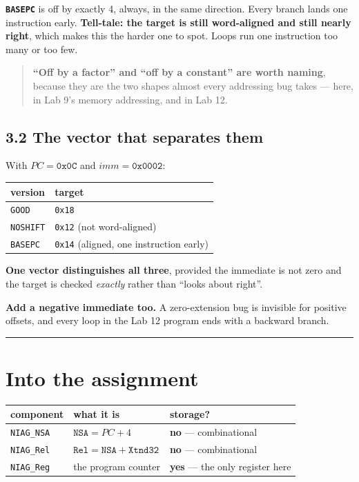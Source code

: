 \documentclass[11pt]{article}
\newcommand{\code}[1]{\texttt{#1}}
\newcommand{\hr}{\vspace{2pt}\hrule\vspace{6pt}}
\begin{document}
\textbf{\code{BASEPC}} is off by exactly 4, always, in the same direction. Every
branch lands one instruction early. \textbf{Tell-tale: the target is still
word-aligned and still nearly right}, which makes this the harder one to spot.
Loops run one instruction too many or too few.

\begin{quote}
\textbf{``Off by a factor'' and ``off by a constant'' are worth naming}, because
they are the two shapes almost every addressing bug takes --- here, in Lab 9's
memory addressing, and in Lab 12.
\end{quote}

\subsection*{3.2 The vector that separates them}

With $PC = \code{0x0C}$ and $imm = \code{0x0002}$:

\begin{center}
\begin{tabular}{ll}
\toprule
version & target \\
\midrule
\code{GOOD} & \code{0x18} \\
\code{NOSHIFT} & \code{0x12} \quad (not word-aligned) \\
\code{BASEPC} & \code{0x14} \quad (aligned, one instruction early) \\
\bottomrule
\end{tabular}
\end{center}

\textbf{One vector distinguishes all three}, provided the immediate is not zero
and the target is checked \emph{exactly} rather than ``looks about right''.

\textbf{Add a negative immediate too.} A zero-extension bug is invisible for
positive offsets, and every loop in the Lab 12 program ends with a backward
branch.

\vspace{4pt}\hr

\section*{Into the assignment}

\begin{center}
\begin{tabular}{lll}
\toprule
component & what it is & storage? \\
\midrule
\code{NIAG\_NSA} & $\code{NSA} = PC + 4$ & \textbf{no} --- combinational \\
\code{NIAG\_Rel} & $\code{Rel} = \code{NSA} + \code{Xtnd32}$ & \textbf{no} --- combinational \\
\code{NIAG\_Reg} & the program counter & \textbf{yes} --- the only register here \\
\bottomrule
\end{tabular}
\end{center}
\end{document}
